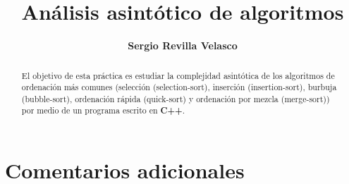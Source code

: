 

\title{\huge{\textbf{Análisis asintótico de algoritmos}}}
\author{\large{\textbf{Sergio Revilla Velasco}}}
\date{}


\maketitle


\begin{abstract}
El objetivo de esta práctica es estudiar la complejidad asintótica de los algoritmos de ordenación más comunes (selección (selection-sort), inserción (insertion-sort), burbuja (bubble-sort), ordenación rápida (quick-sort) y ordenación por mezcla (merge-sort)) por medio de un programa escrito en \textbf{C++}.
\end{abstract}


\tableofcontents{}







\section{Comentarios adicionales}





